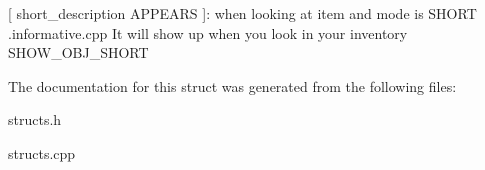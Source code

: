 \mbox{[} \textquotesingle{}short\+\_\+description\textquotesingle{} A\+P\+P\+E\+A\+RS \mbox{]}\+: when looking at item and mode is S\+H\+O\+RT .informative.\+cpp It will show up when you look in your inventory S\+H\+O\+W\+\_\+\+O\+B\+J\+\_\+\+S\+H\+O\+RT 

The documentation for this struct was generated from the following files\+:\begin{DoxyCompactItemize}
\item 
structs.\+h\item 
structs.\+cpp\end{DoxyCompactItemize}
